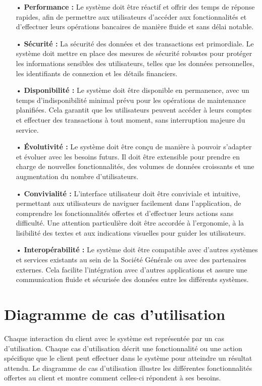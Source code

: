 \begin{itemize}
    \item[•] \textbf{Performance :}  Le système doit être réactif et offrir des temps de réponse rapides, afin de permettre aux utilisateurs d'accéder aux fonctionnalités et d'effectuer leurs opérations bancaires de manière fluide et sans délai notable.
    \item[•] \textbf{ Sécurité :} La sécurité des données et des transactions est primordiale. Le système doit mettre en place des mesures de sécurité robustes pour protéger les informations sensibles des utilisateurs, telles que les données personnelles, les identifiants de connexion et les détails financiers.
    \item[•] \textbf{Disponibilité :} Le système doit être disponible en permanence, avec un temps d'indisponibilité minimal prévu pour les opérations de maintenance planifiées. Cela garantit que les utilisateurs peuvent accéder à leurs comptes et effectuer des transactions à tout moment, sans interruption majeure du service.
    \item[•] \textbf{Évolutivité :} Le système doit être conçu de manière à pouvoir s'adapter et évoluer avec les besoins futurs. Il doit être extensible pour prendre en charge de nouvelles fonctionnalités, des volumes de données croissants et une augmentation du nombre d'utilisateurs.
    \item[•] \textbf{Convivialité :} L'interface utilisateur doit être conviviale et intuitive, permettant aux utilisateurs de naviguer facilement dans l'application, de comprendre les fonctionnalités offertes et d'effectuer leurs actions sans difficulté. Une attention particulière doit être accordée à l'ergonomie, à la lisibilité des textes et aux indications visuelles pour guider les utilisateurs.
    \item[•] \textbf{Interopérabilité :} Le système doit être compatible avec d'autres systèmes et services existants au sein de la Société Générale ou avec des partenaires externes. Cela facilite l'intégration avec d'autres applications et assure une communication fluide et sécurisée des données entre les différents systèmes.
\end{itemize}


\section{Diagramme de cas d'utilisation}
Chaque interaction du client avec le système est représentée par un cas d'utilisation. Chaque cas d'utilisation décrit une fonctionnalité ou une action spécifique que le client peut effectuer dans le système pour atteindre un résultat attendu. Le diagramme de cas d'utilisation illustre les différentes fonctionnalités offertes au client et montre comment celles-ci répondent à ses besoins.\\

